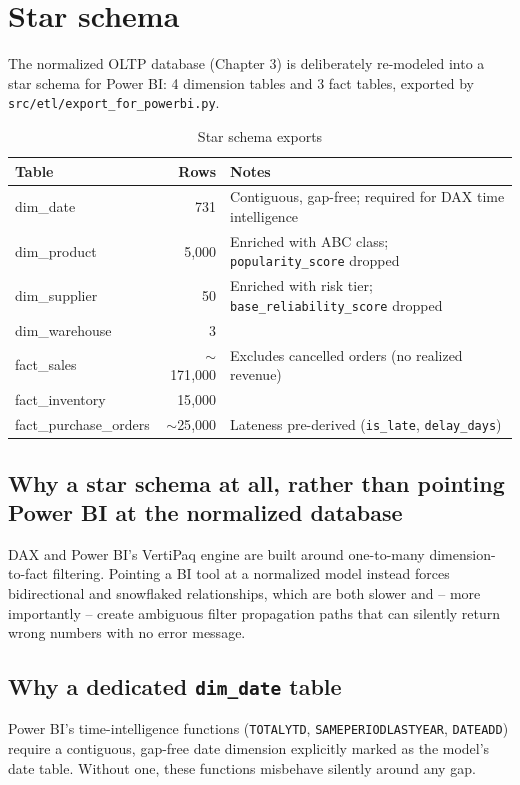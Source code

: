 \documentclass[11pt,a4paper]{report}
\begin{document}
\section{Star schema}

The normalized OLTP database (Chapter 3) is deliberately re-modeled into a
star schema for Power BI: 4 dimension tables and 3 fact tables, exported by
\texttt{src/etl/export\_for\_powerbi.py}.

\begin{table}[H]
\centering
\caption{Star schema exports}
\begin{tabular}{lrl}
\toprule
\textbf{Table} & \textbf{Rows} & \textbf{Notes} \\
\midrule
dim\_date & 731 & Contiguous, gap-free; required for DAX time intelligence \\
dim\_product & 5{,}000 & Enriched with ABC class; \texttt{popularity\_score} dropped \\
dim\_supplier & 50 & Enriched with risk tier; \texttt{base\_reliability\_score} dropped \\
dim\_warehouse & 3 & \\
fact\_sales & $\sim$171{,}000 & Excludes cancelled orders (no realized revenue) \\
fact\_inventory & 15{,}000 & \\
fact\_purchase\_orders & $\sim$25{,}000 & Lateness pre-derived (\texttt{is\_late}, \texttt{delay\_days}) \\
\bottomrule
\end{tabular}
\end{table}

\subsection*{Why a star schema at all, rather than pointing Power BI at the
normalized database}
DAX and Power BI's VertiPaq engine are built around one-to-many
dimension-to-fact filtering. Pointing a BI tool at a normalized model
instead forces bidirectional and snowflaked relationships, which are both
slower and -- more importantly -- create ambiguous filter propagation paths
that can silently return wrong numbers with no error message.

\subsection*{Why a dedicated \texttt{dim\_date} table}
Power BI's time-intelligence functions (\texttt{TOTALYTD},
\texttt{SAMEPERIODLASTYEAR}, \texttt{DATEADD}) require a contiguous,
gap-free date dimension explicitly marked as the model's date table.
Without one, these functions misbehave silently around any gap.
\end{document}
